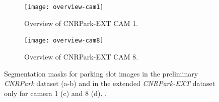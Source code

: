 \begin{figure}
    \begin{subfigure}[b]{0.49\columnwidth}
        \texttt{[image: overview-cam1]}
        \caption{Overview of CNRPark-EXT CAM 1.}
        \label{fig:mini:cam-1}
    \end{subfigure} %
    \begin{subfigure}[b]{0.49\columnwidth}
        \texttt{[image: overview-cam8]}
        \caption{Overview of CNRPark-EXT CAM 8.}
        \label{fig:mini:cam-8}
    \end{subfigure}
    \caption{Segmentation masks for parking slot images in the preliminary \emph{CNRPark} dataset (a-b) and in the extended \emph{CNRPark-EXT} dataset only for camera 1 (c) and 8 (d).
    .}
    \label{fig:mini:cam-overview}
\end{figure}

